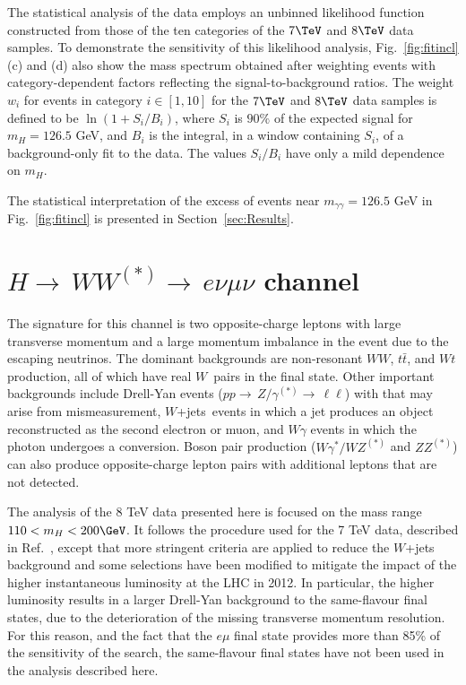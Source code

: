 \documentclass[final,3p,times,twocolumn]{elsarticle}
\newcommand{\hwwenmun}{\ensuremath{H{\rightarrow\,}WW^{(*)}{\rightarrow\,}e\nu\mu\nu}}
\newcommand{\Wjets}{$W$+jets}
\begin{document}
The statistical analysis of the data employs an unbinned likelihood function constructed from
those of the ten categories of the $7\TeV$ and $8\TeV$ data samples.
To demonstrate the sensitivity of this likelihood analysis,
Fig.~\ref{fig:fitincl}(c) and (d) also show the mass spectrum obtained
after weighting events with category-dependent factors reflecting
the signal-to-background ratios. 
The weight $w_i$ for events in category $i\in[1,10]$ for the $7\TeV$ and $8\TeV$ data samples is defined to be $\ln{(1+S_i/B_i)}$, where
$S_i$ is $90\%$ of the expected signal for $m_H=126.5$ GeV,
and $B_i$ is the integral, in a window containing $S_i$, of a background-only fit to the data.
The values $S_i/B_i$ have only a mild dependence on $m_H$.

The statistical interpretation of the excess of events near $m_{\gamma\gamma} = 126.5$ GeV in Fig.~\ref{fig:fitincl} is presented in Section~\ref{sec:Results}.


\section{\texorpdfstring{$\hwwenmun$ channel}{H->WW(*)->evmuv channel}}
\label{sec:hww}

The signature for this channel is two opposite-charge leptons with large transverse
momentum and a large momentum imbalance in the event due to the escaping neutrinos.
The dominant backgrounds are
non-resonant $WW$, $t\bar{t}$, and $Wt$  
production, all of which have real $W$~pairs in the final state.
Other important backgrounds include 
Drell-Yan events ($pp{\to\,}Z/\gamma^{(\ast)}{\to\,}\ell\ell$) with \met{} that may arise from mismeasurement, 
\Wjets\ events in which a jet produces an object reconstructed as the second electron or muon, 
and $W\gamma$ events in which the photon undergoes a conversion.
Boson pair production ($W\gamma^{\ast}/WZ^{(\ast)}$ and $ZZ^{(\ast)}$)  
can also produce opposite-charge lepton pairs with additional leptons that 
are not detected.

The analysis of the 
8 TeV data presented here is 
focused on the mass range $110 < m_H < 200 \GeV$.  
It follows the procedure used for the 7 TeV data, described in Ref.~\cite{ATLAS-4.7fbHWW}, 
except that more stringent criteria are applied to reduce the 
 $W$+jets background and some selections have been modified 
to mitigate the impact of the higher instantaneous luminosity at the LHC in 2012. In particular, 
the higher luminosity results in a larger Drell-Yan background to the same-flavour final states, 
due to the deterioration of the missing transverse momentum resolution.
For this reason, and the fact that the $e\mu$ final state provides more than 85\% of the sensitivity
of the search, the same-flavour final states have not been used in the analysis described here. 
\end{document}
